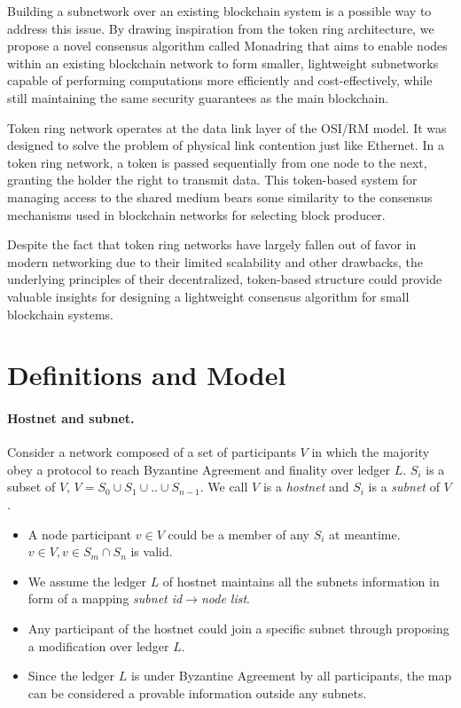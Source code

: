 \documentclass[11pt]{article}
\begin{document}
Building a subnetwork over an existing blockchain system is a possible way to address this issue.
By drawing inspiration from the token ring architecture, we propose a novel consensus algorithm called Monadring that aims to enable nodes within an existing blockchain network to form smaller, lightweight subnetworks capable of performing computations more efficiently and cost-effectively, while still maintaining the same security guarantees as the main blockchain.

Token ring network operates at the data link layer of the OSI/RM model.
It was designed to solve the problem of physical link contention just like Ethernet.
In a token ring network, a token is passed sequentially from one node to the next, granting the holder the right to transmit data.
This token-based system for managing access to the shared medium bears some similarity to the consensus mechanisms used in blockchain networks for selecting block producer.

Despite the fact that token ring networks have largely fallen out of favor in modern networking due to their limited scalability and other drawbacks, the underlying principles of their decentralized, token-based structure could provide valuable insights for designing a lightweight consensus algorithm for small blockchain systems.

\section{Definitions and Model}
\paragraph{Hostnet and subnet.}
Consider a network composed of a set of participants $V$ in which the majority obey a protocol to reach Byzantine Agreement and finality\cite{grandpa} over ledger $L$. $S_{i}$ is a subset of $V$, \( V = S_{0} \cup S_{1} \cup .. \cup S_{n-1}  \). We call $V$ is a \textit{hostnet} and $S_{i}$ is a \textit{subnet} of $V$.
\begin{itemize}
\item A node participant \( v \in V \) could be a member of any $S_{i}$ at meantime.\( v \in V, v \in S_{m} \cap S_{n} \) is valid.
\item We assume the ledger $L$ of hostnet maintains all the subnets information in form of a mapping \textit{subnet id}\( \rightarrow \)\textit{node list}.
\item Any participant of the hostnet could join a specific subnet through proposing a modification over ledger $L$.
\item Since the ledger $L$ is under Byzantine Agreement by all participants, the map can be considered a provable information outside any subnets.
\end{itemize}
\end{document}
